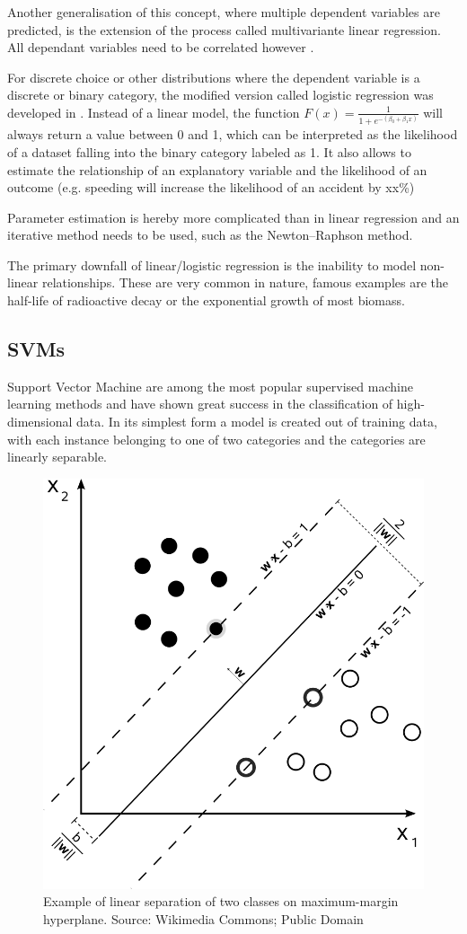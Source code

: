 Another generalisation of this concept, where multiple dependent variables are predicted, is the extension of the process called multivariante linear regression. All dependant variables need to be correlated however \cite{Yan:2009:LRA:1717831}.


For discrete choice or other distributions where the dependent variable is a discrete or binary category, the modified version called logistic regression was developed in \cite{cox58reg}. Instead of a linear model, the  function ${\displaystyle F(x)={\frac {1}{1+e^{-(\beta _{0}+\beta _{1}x)}}}}$ will always return a value between 0 and 1, which can be interpreted as the likelihood of a dataset falling into the binary category labeled as 1. It also allows to estimate the relationship of an explanatory variable and the likelihood of an outcome (e.g. speeding will increase the likelihood of an accident by xx\%)

Parameter estimation is hereby more complicated than in linear regression and an iterative method needs to be used, such as the Newton–Raphson method.


The primary downfall of linear/logistic regression is the inability to model non-linear relationships. These are very common in nature, famous examples are the half-life of radioactive decay or the exponential growth of most biomass.


\subsection{SVMs}


Support Vector Machine are among the most popular supervised machine learning methods and have shown great success in the classification of high-dimensional data. In its simplest form a model is created out of training data, with each instance belonging to one of two categories and the categories are linearly separable.


\begin{figure}[h]
    \centering
	\includegraphics[width=.5\textwidth]{./images/illustrations/svm}
    \caption{Example of linear separation of two classes on maximum-margin hyperplane. Source: Wikimedia Commons; Public Domain}
    \label{fig:svm}
\end{figure}


